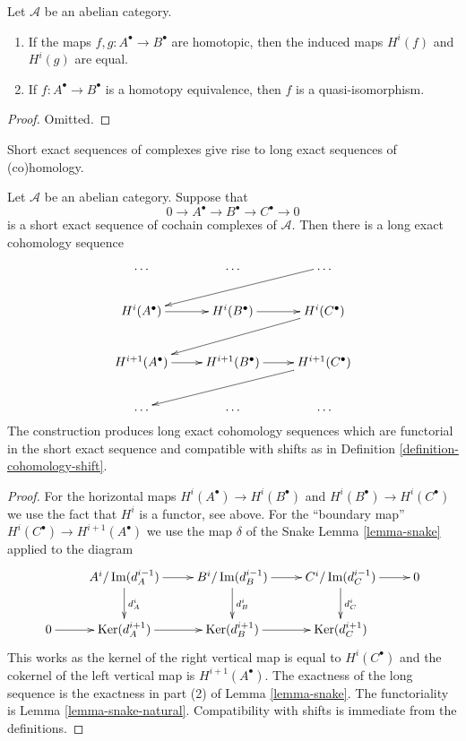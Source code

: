 \begin{lemma}
\label{lemma-map-cohomology-homotopy-cochain}
Let $\mathcal{A}$ be an abelian category.
\begin{enumerate}
\item If the maps $f, g : A^\bullet \to B^\bullet$ are
homotopic, then the induced maps $H^i(f)$ and $H^i(g)$
are equal.
\item If $f : A^\bullet \to B^\bullet$ is a homotopy equivalence,
then $f$ is a quasi-isomorphism.
\end{enumerate}
\end{lemma}

\begin{proof}
Omitted.
\end{proof}

\begin{lemma}
\label{lemma-long-exact-sequence-cochain}
\begin{slogan}
Short exact sequences of complexes give rise to long exact sequences
of (co)homology.
\end{slogan}
Let $\mathcal{A}$ be an abelian category. Suppose that
$$
0 \to
A^\bullet \to
B^\bullet \to
C^\bullet \to
0
$$
is a short exact sequence of cochain complexes of $\mathcal{A}$.
Then there is a long exact cohomology sequence
$$
\xymatrix{
\ldots & \ldots & \ldots \ar[lld] \\
H^i(A^\bullet) \ar[r] &
H^i(B^\bullet) \ar[r] &
H^i(C^\bullet) \ar[lld] \\
H^{i + 1}(A^\bullet) \ar[r] &
H^{i + 1}(B^\bullet) \ar[r] &
H^{i + 1}(C^\bullet) \ar[lld] \\
\ldots & \ldots & \ldots \\
}
$$
The construction produces long exact cohomology sequences
which are functorial in the short exact
sequence and compatible with shifts as in
Definition \ref{definition-cohomology-shift}.
\end{lemma}

\begin{proof}
For the horizontal maps $H^i(A^\bullet) \to H^i(B^\bullet)$ and
$H^i(B^\bullet) \to H^i(C^\bullet)$ we use the fact that $H^i$
is a functor, see above. For the ``boundary map''
$H^i(C^\bullet) \to H^{i + 1}(A^\bullet)$ we use the map $\delta$
of the Snake Lemma \ref{lemma-snake}
applied to the diagram
$$
\xymatrix{
&
A^i/\Im(d_A^{i - 1}) \ar[r] \ar[d]^{d_A^i} &
B^i/\Im(d_B^{i - 1}) \ar[r] \ar[d]^{d_B^i} &
C^i/\Im(d_C^{i - 1}) \ar[r] \ar[d]^{d_C^i} &
0 \\
0 \ar[r] &
\Ker(d_A^{i + 1}) \ar[r] &
\Ker(d_B^{i + 1}) \ar[r] &
\Ker(d_C^{i + 1}) &
}
$$
This works as the kernel of the right vertical map is equal to
$H^i(C^\bullet)$ and the cokernel of the left vertical map is
$H^{i + 1}(A^\bullet)$. The exactness of the long sequence is
the exactness in part (2) of Lemma \ref{lemma-snake}.
The functoriality is Lemma \ref{lemma-snake-natural}. Compatibility
with shifts is immediate from the definitions.
\end{proof}








